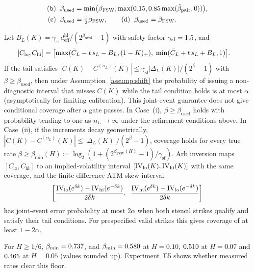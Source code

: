 \begin{theorem}
\begin{enumerate}[(i)]
\[\begin{aligned}
    \text{(b)}\;\;&\beta_{\mathrm{used}}=\min\bigl(\beta_{\mathrm{FSW}},  \max(0.15,0.85\max(\hat{\beta}_{\mathrm{pair}},0))\bigr),\\
    \text{(c)}\;\;&\beta_{\mathrm{used}}=\tfrac12\beta_{\mathrm{FSW}},\qquad \text{(d)}\;\;\beta_{\mathrm{used}}=\beta_{\mathrm{FSW}}.
    \end{aligned}
  \]
\end{enumerate}
Let $B_L(K)=\gamma_{\mathrm{sf}}\,d_{\mathrm{eff}}^{\mathrm{hi}}/(2^{\beta_{\mathrm{used}}}-1)$ with safety factor $\gamma_{\mathrm{sf}}=1.5$, and
\[
  \begin{aligned}
  &[C_{\mathrm{lo}},C_{\mathrm{hi}}]=\bigl[\max(\bar{C}_L-t\,s_L-B_L,(1-K)_+),\;  \min(\bar{C}_L+t\,s_L+B_L,1)\bigr].
  \end{aligned}
\]
If the tail satisfies $|C(K)-C^{(n_L)}(K)|\le\gamma_{\mathrm{sf}}|\Delta_L(K)|/(2^{\beta}-1)$ with $\beta\ge\beta_{\mathrm{used}}$, then under Assumption~\ref{assump:shift} the probability of issuing a non-diagnostic interval that misses $C(K)$ while the tail condition holds is at most $\alpha$ (asymptotically for limiting calibration). This joint-event guarantee does not give conditional coverage after a gate passes. In Case~(i), $\beta\ge\beta_{\mathrm{used}}$ holds with probability tending to one as $n_L\to\infty$ under the refinement conditions above. In Case~(ii), if the increments decay geometrically, $|C(K)-C^{(n_L)}(K)|\le|\Delta_L(K)|/(2^{\beta}-1)$, coverage holds for every true rate $\beta\ge\beta_{\min}(H)\coloneqq\log_2(1+(2^{\beta_{\mathrm{FSW}}(H)}-1)/\gamma_{\mathrm{sf}})$. Arb inversion maps $[C_{\mathrm{lo}},C_{\mathrm{hi}}]$ to an implied-volatility interval $[\mathrm{IV}_{\mathrm{lo}}(K),\mathrm{IV}_{\mathrm{hi}}(K)]$ with the same coverage, and the finite-difference ATM skew interval
\begin{equation}
  \left[\frac{\mathrm{IV}_{\mathrm{lo}}(e^{\delta k})-\mathrm{IV}_{\mathrm{hi}}(e^{-\delta k})}{2\delta k},\;\;
        \frac{\mathrm{IV}_{\mathrm{hi}}(e^{\delta k})-\mathrm{IV}_{\mathrm{lo}}(e^{-\delta k})}{2\delta k}\right]
  \label{eq:skew_interval}
\end{equation}
has joint-event error probability at most $2\alpha$ when both stencil strikes qualify and satisfy their tail conditions. For prespecified valid strikes this gives coverage of at least $1-2\alpha$.
\end{theorem}

For $H\ge 1/6$, $\beta_{\min}=0.737$, and $\beta_{\min}=0.580$ at $H=0.10$, $0.510$ at $H=0.07$ and $0.465$ at $H=0.05$ (values rounded up). Experiment~E5 shows whether measured rates clear this floor.

